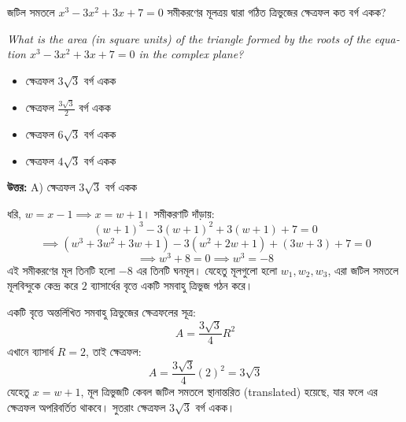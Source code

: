 \documentclass[12pt, a4paper]{article}
\begin{document}
\vspace{1.5em}

\begin{tcolorbox}[questionbox={প্রশ্ন (Question) 48}]
    \noindent
    জটিল সমতলে $x^3 - 3x^2 + 3x + 7 = 0$ সমীকরণের মূলত্রয় দ্বারা গঠিত ত্রিভুজের ক্ষেত্রফল কত বর্গ একক?
    
    \vspace{0.8em}
    \begin{english}
    \noindent\textit{\color{darkgray}
    What is the area (in square units) of the triangle formed by the roots of the equation $x^3 - 3x^2 + 3x + 7 = 0$ in the complex plane?
    }
    \end{english}
\end{tcolorbox}

\begin{itemize}[label={}, leftmargin=1cm, itemsep=0.5em]
    \item[\textbf{A)}] ক্ষেত্রফল $3\sqrt{3}$ বর্গ একক
    \item[\textbf{B)}] ক্ষেত্রফল $\frac{3\sqrt{3}}{2}$ বর্গ একক
    \item[\textbf{C)}] ক্ষেত্রফল $6\sqrt{3}$ বর্গ একক
    \item[\textbf{D)}] ক্ষেত্রফল $4\sqrt{3}$ বর্গ একক
\end{itemize}

\vspace{0.5em}
\begin{tcolorbox}[answerbox]
    \textbf{\color{success} উত্তর:} A) ক্ষেত্রফল $3\sqrt{3}$ বর্গ একক
\end{tcolorbox}
\vspace{1em}

\begin{tcolorbox}[solutionbox={সমাধান (Solution)}]
    \noindent
    ধরি, $w = x - 1 \implies x = w + 1$। 
    সমীকরণটি দাঁড়ায়:
    \[ (w+1)^3 - 3(w+1)^2 + 3(w+1) + 7 = 0 \]
    \[ \implies (w^3 + 3w^2 + 3w + 1) - 3(w^2 + 2w + 1) + (3w + 3) + 7 = 0 \]
    \[ \implies w^3 + 8 = 0 \implies w^3 = -8 \]
    এই সমীকরণের মূল তিনটি হলো $-8$ এর তিনটি ঘনমূল। 
    যেহেতু মূলগুলো হলো $w_1, w_2, w_3$, এরা জটিল সমতলে মূলবিন্দুকে কেন্দ্র করে $2$ ব্যাসার্ধের বৃত্তে একটি সমবাহু ত্রিভুজ গঠন করে। 
    
    \vspace{0.5em}
    একটি বৃত্তে অন্তর্লিখিত সমবাহু ত্রিভুজের ক্ষেত্রফলের সূত্র:
    \[ A = \frac{3\sqrt{3}}{4} R^2 \]
    এখানে ব্যাসার্ধ $R = 2$, তাই ক্ষেত্রফল:
    \[ A = \frac{3\sqrt{3}}{4} (2)^2 = 3\sqrt{3} \]
    যেহেতু $x = w + 1$, মূল ত্রিভুজটি কেবল জটিল সমতলে স্থানান্তরিত (translated) হয়েছে, যার ফলে এর ক্ষেত্রফল অপরিবর্তিত থাকবে। 
    সুতরাং ক্ষেত্রফল $3\sqrt{3}$ বর্গ একক।
\end{tcolorbox}
\end{document}
